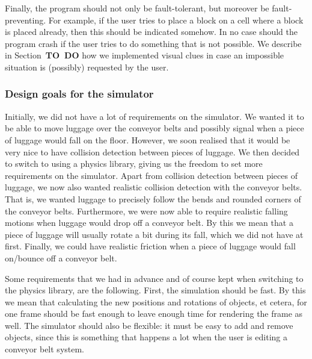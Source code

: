Finally, the program should not only be fault-tolerant, but moreover be fault-preventing. For example, if the user tries to place a block on a cell where a block is placed already, then this should be indicated somehow. In no case should the program crash if the user tries to do something that is not possible. We describe in Section~\textbf{TO~DO} how we implemented visual clues in case an impossible situation is (possibly) requested by the user.

\subsubsection{Design goals for the simulator}
\label{subsubsec:design-goals-simulator}
Initially, we did not have a lot of requirements on the simulator. We wanted it to be able to move luggage over the conveyor belts and possibly signal when a piece of luggage would fall on the floor. However, we soon realised that it would be very nice to have collision detection between pieces of luggage. We then decided to switch to using a physics library, giving us the freedom to set more requirements on the simulator. Apart from collision detection between pieces of luggage, we now also wanted realistic collision detection with the conveyor belts. That is, we wanted luggage to precisely follow the bends and rounded corners of the conveyor belts. Furthermore, we were now able to require realistic falling motions when luggage would drop off a conveyor belt. By this we mean that a piece of luggage will usually rotate a bit during its fall, which we did not have at first. Finally, we could have realistic friction when a piece of luggage would fall on/bounce off a conveyor belt.

Some requirements that we had in advance and of course kept when switching to the physics library, are the following. First, the simulation should be fast. By this we mean that calculating the new positions and rotations of objects, et cetera, for one frame should be fast enough to leave enough time for rendering the frame as well. The simulator should also be flexible: it must be easy to add and remove objects, since this is something that happens a lot when the user is editing a conveyor belt system.